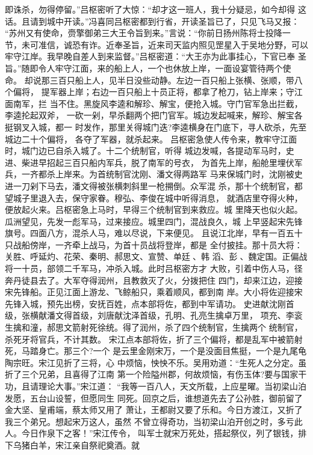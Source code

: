 即诛杀，勿得停留。”吕枢密听了大惊：“却才这一班人，我十分疑忌，如今却得
这话。且请到城中开读。”冯喜同吕枢密都到行省，开读圣旨已了，只见飞马又报：
“苏州又有使命，赍擎御弟三大王令旨到来。”言说：“你前日扬州陈将士投降一
节，未可准信，诚恐有诈。近奉圣旨，近来司天监内照见罡星入于吴地分野，可以
牢守江岸。我早晚自差人到来监督。”吕枢密道：“大王亦为此事挂心，下官已奉
圣旨。”随即令人牢守江面，来的船上人，一个也休放上岸，一面设宴管待两个使
命。
却说那三百只船上人，见半日没些动静。左边一百只船上张横、张顺，带八个偏将，
提军器上岸；右边一百只船上十员正将，都拿了枪刀，钻上岸来；守江面南军，拦
当不住。黑旋风李逵和解珍、解宝，便抢入城。守门官军急出拦截，李逵抡起双斧，
一砍一剁，早杀翻两个把门官军。城边发起喊来，解珍、解宝各挺钢叉入城，都一
时发作，那里关得城门迭?李逵横身在门底下，寻人砍杀，先至城边二十个偏将，
各夺了军器，就杀起来。
吕枢密急使人传令来，教牢守江面时，城门边已自杀入城了。十二个统制官，听得
城边发喊，各提动军马时，史进、柴进早招起三百只船内军兵，脱了南军的号衣，
为首先上岸，船舱里埋伏军兵，一齐都杀上岸来。为首统制官沈刚、潘文得两路军
马来保城门时，沈刚被史进一刀剁下马去，潘文得被张横刺斜里一枪搠倒。众军混
杀，那十个统制官，都望城子里退入去，保守家眷。穆弘、李俊在城中听得消息，
就酒店里夺得火种，便放起火来。吕枢密急上马时，早得三个统制官到来救应。城
里降天也似火起。瓜洲望见，先发一彪军马，过来接应。城里四门，混战良久，城
上早竖起宋先锋旗号。四面八方，混杀人马，难以尽说，下来便见。
且说江北岸，早有一百五十只战船傍岸，一齐牵上战马，为首十员战将登岸，都是
全付披挂。那十员大将：关胜、呼延灼、花荣、秦明、郝思文、宣赞、单廷、韩
滔、彭、魏定国。正偏战将一十员，部领二千军马，冲杀入城。此时吕枢密方才
大败，引着中伤人马，径奔丹徒县去了。大军夺得润州，且教救灭了火，分拨把住
四门，却来江边，迎接宋先锋船。正见江面上游龙、飞鲸船只，乘着顺风，都到南
岸。大小将佐迎接宋先锋入城，预先出榜，安抚百姓，点本部将佐，都到中军请功。
史进献沈刚首级，张横献潘文得首级，刘唐献沈泽首级，孔明、孔亮生擒卓万里，
项充、李衮生擒和潼，郝思文箭射死徐统。得了润州，杀了四个统制官，生擒两个
统制官，杀死牙将官兵，不计其数。
宋江点本部将佐，折了三个偏将，都是乱军中被箭射死，马踏身亡。那三个?一个
是云里金刚宋万，一个是没面目焦挺，一个是九尾龟陶宗旺。宋江见折了三将，心
中烦恼，怏怏不乐。吴用劝道：“生死人之分定。虽折了三个兄弟，且喜得了江南
第一个险隘州郡，何故烦恼，有伤玉体?要与国家干功，且请理论大事。”宋江道：
“我等一百八人，天文所载，上应星曜。当初梁山泊发愿，五台山设誓，但愿同生
同死。回京之后，谁想道先去了公孙胜，御前留了金大坚、皇甫端，蔡太师又用了
萧让，王都尉又要了乐和。今日方渡江，又折了我三个弟兄。想起宋万这人，虽然
不曾立得奇功，当初梁山泊开创之时，多亏此人。今日作泉下之客！”宋江传令，
叫军士就宋万死处，搭起祭仪，列了银钱，排下乌猪白羊，宋江亲自祭祀奠酒。就

